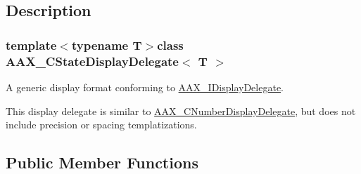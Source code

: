 \subsection{Description}
\subsubsection*{template$<$typename T$>$class A\+A\+X\+\_\+\+C\+State\+Display\+Delegate$<$ T $>$}

A generic display format conforming to \hyperlink{a00092}{A\+A\+X\+\_\+\+I\+Display\+Delegate}. 

This display delegate is similar to \hyperlink{a00028}{A\+A\+X\+\_\+\+C\+Number\+Display\+Delegate}, but does not include precision or spacing templatizations. \subsection*{Public Member Functions}
